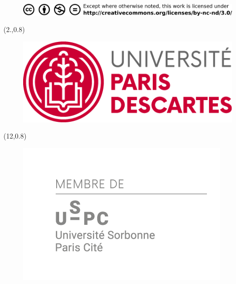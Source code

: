 \documentclass[twoside, justified, notoc, nobib, 
	nohyper]{tufte-book}
\begin{document}
\begin{titlepage}
\begin{fullwidth}
\begin{figure}[b]
\begin{center}
\includegraphics{figures/title/creativecommons}
\end{center}
\end{figure}

\end{fullwidth}
\end{titlepage}

\clearpage\null\newpage


\thispagestyle{plain}
\begin{textblock}{5}(2.,0.8)
\begin{figure}
\includegraphics[width=\linewidth]{figures/title/LogoParisDescartes.png}
\end{figure}
\end{textblock}

\begin{textblock}{2.4}(12,0.8)
\begin{figure}
\includegraphics[width=\linewidth]{figures/title/Membre-USPC-Gris_06-09-2016.png}
\end{figure}
\end{textblock}
\end{document}
